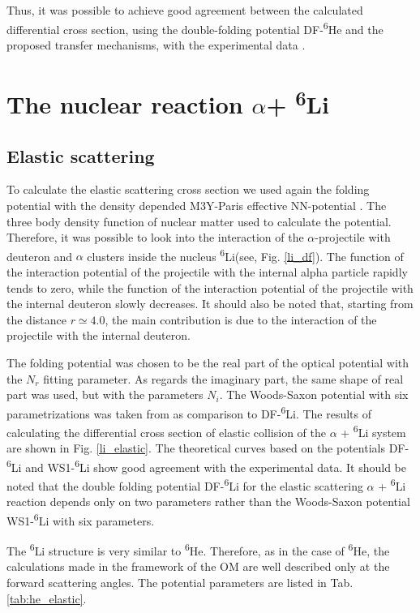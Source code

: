 \documentclass[
12pt, %
oneside, %
english, %
onehalfspacing, %
onehalfspacing, %
headsepline, %
]{MastersDoctoralThesis} %
\newcommand{\he}{\textsuperscript{6}He\xspace}
\newcommand{\li}{\textsuperscript{6}Li\xspace}
\begin{document}
Thus, it was possible to achieve good agreement between the calculated differential cross section, using the double-folding potential DF-\he and the proposed transfer mechanisms, with the experimental data \cite{oganessian1999dynamics}.


\chapter{The nuclear reaction $\alpha$+ \li }
\section{Elastic scattering}

To calculate the elastic scattering cross section we used again the folding potential with the density depended M3Y-Paris effective NN-potential \cite{anantaraman1983effective}. The three body density function of nuclear matter used to calculate the potential. Therefore, it was possible to look into the interaction of the $\alpha$-projectile with deuteron and $\alpha$ clusters inside the nucleus \li (see, Fig. \ref{li_df}). The function of the interaction potential of the projectile with the internal alpha particle rapidly tends to zero, while the function of the interaction potential of the projectile with the internal deuteron slowly decreases. It should also be noted that, starting from the distance $r \simeq 4.0$, the main contribution is due to the interaction of the projectile with the internal deuteron.

The folding potential was chosen to be the real part of the optical potential with the $N_r$ fitting parameter. As regards the imaginary part, the same shape of real part was used, but with the parameters $N_i$. 
The Woods-Saxon potential with six parametrizations was taken from \cite{oganessian1999dynamics} as comparison to DF-\li.  
The results of calculating the differential cross section of elastic collision of the $ \alpha $ + \li system are shown in Fig. \ref{li_elastic}. 
The theoretical curves based on the potentials DF-\li and WS1-\li show good agreement with the experimental data.
 It should be noted that the double folding potential DF-\li  for the elastic scattering $\alpha$ + \li  reaction depends only on two parameters rather than the Woods-Saxon potential WS1-\li with six parameters.
 
  The \li structure is very similar to  \he. Therefore, as in the case of \he, the calculations made in the framework of the OM are well described only at the forward scattering angles. The potential parameters are listed in Tab. \ref{tab:he_elastic}.
 
\end{document}
